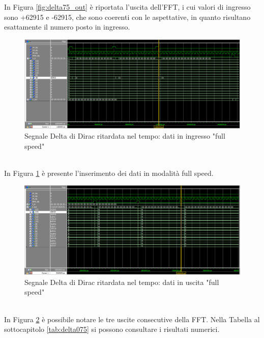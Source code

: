 \documentclass[a4paper, titlepage]{article}
\begin{document}
In Figura \ref{fig:delta75_out} è riportata l'uscita dell'FFT, i cui valori di ingresso sono +62915 e -62915, che sono coerenti con le aspettative, in quanto risultano esattamente il numero posto in ingresso.
\begin{figure}[h]
    \centering
    \includegraphics[scale=0.45]{test_delta_0.75/fs_d075_in_doble.png}
    \caption{Segnale Delta di Dirac ritardata nel tempo: dati in ingresso "full speed"}
    \label{fig:delta75_in_doble}
\end{figure}\\
In Figura \ref{fig:delta75_in_doble} è presente l'inserimento dei dati in modalità full speed.
\pagebreak
\begin{figure}[h]
    \centering
    \includegraphics[scale=0.45]{test_delta_0.75/fs_d075_out_doble.png}
    \caption{Segnale Delta di Dirac ritardata nel tempo: dati in uscita "full speed"}
    \label{fig:delta75_out_doble}
\end{figure}\\
In Figura \ref{fig:delta75_out_doble} è possibile notare le tre uscite consecutive della FFT. Nella Tabella al sottocapitolo \ref{tab:delta075} si possono consultare i risultati numerici.
\end{document}

